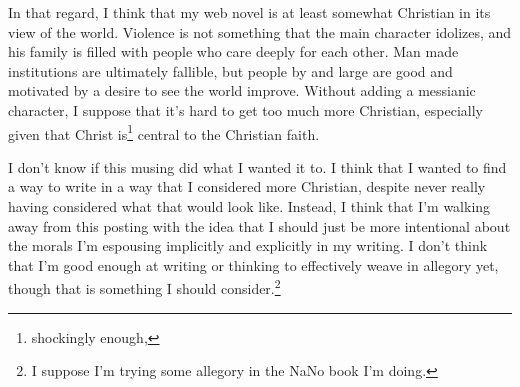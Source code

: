 \documentclass[12pt]{article}[titlepage]
\newcommand{\1}{\={a}}
\newcommand{\2}{\={e}}
\newcommand{\3}{\={\i}}
\newcommand{\4}{\=o}
\newcommand{\5}{\=u}
\newcommand{\6}{\={A}}
\renewcommand{\,}{\textsuperscript{,}}
\begin{document}
In that regard, I think that my web novel is at least somewhat Christian in its view of the world.
Violence is not something that the main character idolizes, and his family is filled with people who care deeply for each other.
Man made institutions are ultimately fallible, but people by and large are good and motivated by a desire to see the world improve.
Without adding a messianic character, I suppose that it's hard to get too much more Christian, especially given that Christ is\footnote{shockingly enough,} central to the Christian faith.

I don't know if this musing did what I wanted it to.
I think that I wanted to find a way to write in a way that I considered more Christian, despite never really having considered what that would look like.
Instead, I think that I'm walking away from this posting with the idea that I should just be more intentional about the morals I'm espousing implicitly and explicitly in my writing.
I don't think that I'm good enough at writing or thinking to effectively weave in allegory yet, though that is something I should consider.\footnote{I suppose I'm trying some allegory in the NaNo book I'm doing.}
\end{document}
